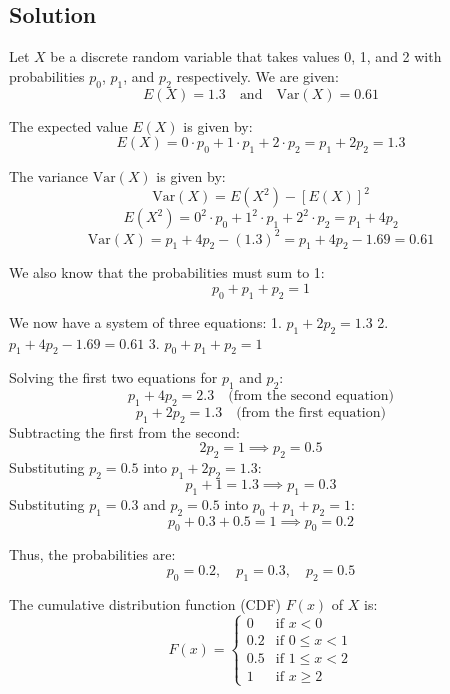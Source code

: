 \documentclass{article}
\begin{document}
\subsection*{Solution}

Let \(X\) be a discrete random variable that takes values 0, 1, and 2 with probabilities \(p_0\), \(p_1\), and \(p_2\) respectively. We are given:
\[
E(X) = 1.3 \quad \text{and} \quad \text{Var}(X) = 0.61
\]

The expected value \(E(X)\) is given by:
\[
E(X) = 0 \cdot p_0 + 1 \cdot p_1 + 2 \cdot p_2 = p_1 + 2p_2 = 1.3
\]

The variance \(\text{Var}(X)\) is given by:
\[
\text{Var}(X) = E(X^2) - [E(X)]^2
\]
\[
E(X^2) = 0^2 \cdot p_0 + 1^2 \cdot p_1 + 2^2 \cdot p_2 = p_1 + 4p_2
\]
\[
\text{Var}(X) = p_1 + 4p_2 - (1.3)^2 = p_1 + 4p_2 - 1.69 = 0.61
\]

We also know that the probabilities must sum to 1:
\[
p_0 + p_1 + p_2 = 1
\]

We now have a system of three equations:
1. \(p_1 + 2p_2 = 1.3\)
2. \(p_1 + 4p_2 - 1.69 = 0.61\)
3. \(p_0 + p_1 + p_2 = 1\)

Solving the first two equations for \(p_1\) and \(p_2\):
\[
p_1 + 4p_2 = 2.3 \quad \text{(from the second equation)}
\]
\[
p_1 + 2p_2 = 1.3 \quad \text{(from the first equation)}
\]
Subtracting the first from the second:
\[
2p_2 = 1 \implies p_2 = 0.5
\]
Substituting \(p_2 = 0.5\) into \(p_1 + 2p_2 = 1.3\):
\[
p_1 + 1 = 1.3 \implies p_1 = 0.3
\]
Substituting \(p_1 = 0.3\) and \(p_2 = 0.5\) into \(p_0 + p_1 + p_2 = 1\):
\[
p_0 + 0.3 + 0.5 = 1 \implies p_0 = 0.2
\]

Thus, the probabilities are:
\[
p_0 = 0.2, \quad p_1 = 0.3, \quad p_2 = 0.5
\]

The cumulative distribution function (CDF) \(F(x)\) of \(X\) is:
\[
F(x) = 
\begin{cases} 
0 & \text{if } x < 0 \\
0.2 & \text{if } 0 \leq x < 1 \\
0.5 & \text{if } 1 \leq x < 2 \\
1 & \text{if } x \geq 2 
\end{cases}
\]
\end{document}
